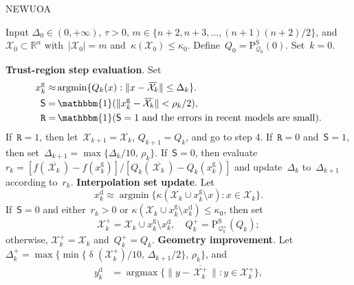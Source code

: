 \documentclass[11pt,a4paper,draft]{article}  %
\theoremstyle{definition}
\numberwithin{equation}{section}
\newcommand{\mbar}[1]{\,\overline{\!{#1}\!}\,} %
\newcommand{\xopt}{\mbar}
\DeclareMathOperator{\xdist}{\updelta}
\DeclareMathOperator*{\argmax}{argmax}
\DeclareMathOperator*{\argmin}{argmin}
\DeclareMathOperator{\ind}{\mathbbm{1}}
\newcommand{\shortd}{\mathsf{S}}
\newcommand{\redrho}{\mathtt{R}}
\newcommand{\RR}{\mathbb{R}}
\newcommand{\Int}{\mathcal{X}}
\newcommand{\Qua}{\mathcal{Q}}
\newcommand{\sss}[1]{{\scriptscriptstyle{#1}}}
\newcommand{\get}{{\textrm{g}}}
\newcommand{\drop}{{\textrm{d}}}
\newcommand{\new}{{\sss{+}}}
\newcommand{\sob}{{\scriptscriptstyle{\textrm{S}}}}
\newcommand{\Projs}{\mathrm{P}^\sob}
\begin{document}
\begin{algorithm}[htbp!]
    \caption{\label{alg:newuoa}NEWUOA}
    Input $\Delta_0\in (0,+\infty)$, $\tau>0$, $m\in \{n+2, n+3, \dots, (n+1)(n+2)/2\}$,
    and~$\Int_0\subset \RR^n$ with~$|\Int_0|=m$ and~$\kappa(\Int_0) \le \kappa_0$.
    Define~$Q_0 = \Projs_{\Qua_0}(0)$.
    Set~$k=0$.
    \begin{algorithmic}[1]
        \State \textbf{Trust-region step evaluation}.
        Set
        \begin{align}
             \label{eq:xgetn}
             x_k^\get \approx &\argmin\{Q_k(x)\mathrel{:} \|x-\xopt{\Int_k}\|\le \Delta_k\}.\\
            \label{eq:shortd}
            \shortd = &\ind(\|x_k^\get-\xopt{\Int_k}\| < \rho_k/2),\\
            \label{eq:redrho}
            \redrho = & \ind(\shortd=1\text{ and the errors in recent models are small}).
        \end{align}
        If~$\redrho = 1$, then let~$\Int_{k+1} = \Int_k$, $Q_{k+1} = Q_k$, and go to step 4.
        If~$\redrho = 0$ and~$\shortd = 1$, then set~$\Delta_{k+1} = \max\{\Delta_k/10,\, \rho_k\}$.
        If~$\shortd = 0$, then evaluate $r_k = [f(\xopt{\Int_k})-f(x_k^\get)]/[Q_k(\xopt{\Int_k})-Q_k(x_k^\get)]$ and update~$\Delta_k$ to~$\Delta_{k+1}$ according to~$r_k$.
        \State \textbf{Interpolation set update}.
        Let
        \begin{equation}
            \label{eq:xdropn}
            x_k^\drop \approx \argmin\{\kappa(\Int_k\cup x_k^\get\setminus x) \mathrel{:} x \in
            \Int_k\}.
        \end{equation}
        If~$\shortd = 0$ and either~$r_k>0$ or $\kappa(\Int_k\cup x_k^\get \setminus x_k^\drop) \le
        \kappa_0$, then set
        \begin{equation}
            \label{eq:updateq1}
            \Int^{\new}_{k} = \Int_k\cup x_k^\get\setminus x_k^\drop, \quad
            {Q}^{\new}_k = \Projs_{\Qua_k^\new}(Q_k);
        \end{equation}
        otherwise, $\Int_k^\new = \Int_k$ and~$Q_k^\new =Q_k$.
        \State \textbf{Geometry improvement}.
        Let~$\Delta^{\new}_k = \max\{\min\{\xdist(\Int_k^\new)/10,\, \Delta_{k+1}/2\},\,\rho_{k}\}$,
        and
          \begin{align}
              \label{eq:ydropn}
              y_k^\drop &= \argmax\{\|y-\xopt{\Int^{\new}_k}\| \mathrel{:} y \in \Int^{\new}_k\},\\

\end{align}
\end{algorithmic}
\end{algorithm}
\end{document}
